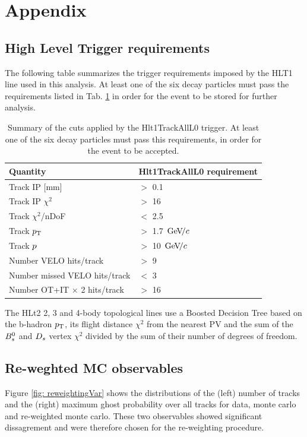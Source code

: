 \section{Appendix}
\label{sec: appendix}

\subsection{High Level Trigger requirements}
\label{sec: trigger}
The following table summarizes the trigger requirements imposed by the HLT1 line used in this analysis. 
At least one of the six decay particles must pass the requirements listed in Tab. \ref{table:HLT1} in order for the event to be stored for further analysis.

\begin{table}[h]
\centering
 \begin{tabular}{l l}
Quantity & Hlt1TrackAllL0 requirement \\
  \hline
Track IP [mm] & $>$ 0.1\\
Track IP $\chi^{2}$ & $>$ 16\\
Track $\chi^{2}$/nDoF & $<$ 2.5\\
Track $\mbox{$p_{\mathrm{ T}}$}$ & $>$ 1.7 ${\mathrm{\,Ge\kern -0.1em V\!/}c}$\\
Track $\mbox{$p$}$ & $>$ 10 ${\mathrm{\,Ge\kern -0.1em V\!/}c}$\\
Number VELO hits/track & $>$ 9\\
Number missed VELO hits/track & $<$ 3\\
Number OT+IT $\times$ 2 hits/track & $>$ 16\\
\end{tabular}
\caption{Summary of the cuts applied by the Hlt1TrackAllL0 trigger. At least one of the six decay particles must pass this requirements, in order for the event to be accepted.}
\label{table:HLT1}
\end{table}

The HLt2 2, 3 and 4-body topological lines use a Boosted Decision Tree based on the b-hadron $\mbox{$p_{\mathrm{ T}}$}$, 
its flight distance $\chi^{2}$ from the nearest PV and the sum of the ${{B}^0_{s}}$ and ${{D}_{s}}$ vertex $\chi^{2}$ divided by the sum of their number of degrees of freedom.


\subsection{Re-weghted MC observables}
\label{sec: mcvdata}
Figure \ref{fig: reweightingVar} shows the distributions of the (left) number of tracks and the (right) maximum ghost probability over all tracks for data, monte carlo and re-weighted monte carlo.
These two observables showed significant dissagrement and were therefore chosen for the re-weighting procedure.

